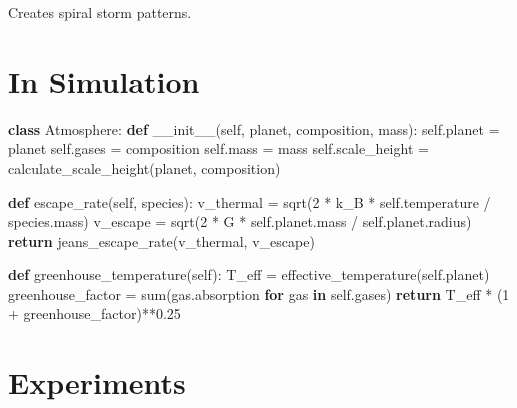 \documentclass[
  11pt,
  letterpaper,
  twoside,
  openright]{book}
\newenvironment{Shaded}{\begin{snugshade}}{\end{snugshade}}
\newcommand{\BuiltInTok}[1]{\textcolor[rgb]{0.00,0.23,0.31}{#1}}
\newcommand{\ControlFlowTok}[1]{\textcolor[rgb]{0.00,0.23,0.31}{\textbf{#1}}}
\newcommand{\DecValTok}[1]{\textcolor[rgb]{0.68,0.00,0.00}{#1}}
\newcommand{\FloatTok}[1]{\textcolor[rgb]{0.68,0.00,0.00}{#1}}
\newcommand{\FunctionTok}[1]{\textcolor[rgb]{0.28,0.35,0.67}{#1}}
\newcommand{\KeywordTok}[1]{\textcolor[rgb]{0.00,0.23,0.31}{\textbf{#1}}}
\newcommand{\NormalTok}[1]{\textcolor[rgb]{0.00,0.23,0.31}{#1}}
\newcommand{\OperatorTok}[1]{\textcolor[rgb]{0.37,0.37,0.37}{#1}}
\newcommand{\VariableTok}[1]{\textcolor[rgb]{0.07,0.07,0.07}{#1}}
\begin{document}
Creates spiral storm patterns.

\section{In Simulation}\label{in-simulation-8}

\begin{Shaded}
\begin{Highlighting}[]
\KeywordTok{class}\NormalTok{ Atmosphere:}
    \KeywordTok{def} \FunctionTok{\_\_init\_\_}\NormalTok{(}\VariableTok{self}\NormalTok{, planet, composition, mass):}
        \VariableTok{self}\NormalTok{.planet }\OperatorTok{=}\NormalTok{ planet}
        \VariableTok{self}\NormalTok{.gases }\OperatorTok{=}\NormalTok{ composition}
        \VariableTok{self}\NormalTok{.mass }\OperatorTok{=}\NormalTok{ mass}
        \VariableTok{self}\NormalTok{.scale\_height }\OperatorTok{=}\NormalTok{ calculate\_scale\_height(planet, composition)}

    \KeywordTok{def}\NormalTok{ escape\_rate(}\VariableTok{self}\NormalTok{, species):}
\NormalTok{        v\_thermal }\OperatorTok{=}\NormalTok{ sqrt(}\DecValTok{2} \OperatorTok{*}\NormalTok{ k\_B }\OperatorTok{*} \VariableTok{self}\NormalTok{.temperature }\OperatorTok{/}\NormalTok{ species.mass)}
\NormalTok{        v\_escape }\OperatorTok{=}\NormalTok{ sqrt(}\DecValTok{2} \OperatorTok{*}\NormalTok{ G }\OperatorTok{*} \VariableTok{self}\NormalTok{.planet.mass }\OperatorTok{/} \VariableTok{self}\NormalTok{.planet.radius)}
        \ControlFlowTok{return}\NormalTok{ jeans\_escape\_rate(v\_thermal, v\_escape)}

    \KeywordTok{def}\NormalTok{ greenhouse\_temperature(}\VariableTok{self}\NormalTok{):}
\NormalTok{        T\_eff }\OperatorTok{=}\NormalTok{ effective\_temperature(}\VariableTok{self}\NormalTok{.planet)}
\NormalTok{        greenhouse\_factor }\OperatorTok{=} \BuiltInTok{sum}\NormalTok{(gas.absorption }\ControlFlowTok{for}\NormalTok{ gas }\KeywordTok{in} \VariableTok{self}\NormalTok{.gases)}
        \ControlFlowTok{return}\NormalTok{ T\_eff }\OperatorTok{*}\NormalTok{ (}\DecValTok{1} \OperatorTok{+}\NormalTok{ greenhouse\_factor)}\OperatorTok{**}\FloatTok{0.25}
\end{Highlighting}
\end{Shaded}

\section{Experiments}\label{experiments-16}
\end{document}
